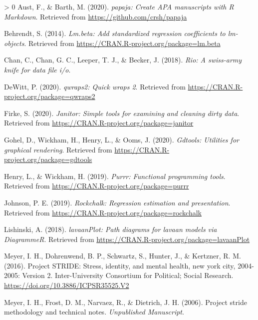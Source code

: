 \documentclass[
  english,
  man,floatsintext]{apa6}
\newlength{\cslhangindent}
\newenvironment{CSLReferences}[3] %
 {%
  \setlength{\parindent}{0pt}
  \ifodd #1 \everypar{\setlength{\hangindent}{\cslhangindent}}\ignorespaces\fi
  \ifnum #2 > 0
  \setlength{\parskip}{#2\baselineskip}
  \fi
 }%
 {}
\begin{document}
\hypertarget{refs}{}
\begin{CSLReferences}{1}{0}
\leavevmode\hypertarget{ref-R-papaja}{}%
Aust, F., \& Barth, M. (2020). \emph{{papaja}: {Create} {APA} manuscripts with {R Markdown}}. Retrieved from \url{https://github.com/crsh/papaja}

\leavevmode\hypertarget{ref-R-lm.beta}{}%
Behrendt, S. (2014). \emph{Lm.beta: Add standardized regression coefficients to lm-objects}. Retrieved from \url{https://CRAN.R-project.org/package=lm.beta}

\leavevmode\hypertarget{ref-R-rio}{}%
Chan, C., Chan, G. C., Leeper, T. J., \& Becker, J. (2018). \emph{Rio: A swiss-army knife for data file i/o}.

\leavevmode\hypertarget{ref-R-qwraps2}{}%
DeWitt, P. (2020). \emph{qwraps2: Quick wraps 2}. Retrieved from \url{https://CRAN.R-project.org/package=qwraps2}

\leavevmode\hypertarget{ref-R-janitor}{}%
Firke, S. (2020). \emph{Janitor: Simple tools for examining and cleaning dirty data}. Retrieved from \url{https://CRAN.R-project.org/package=janitor}

\leavevmode\hypertarget{ref-R-gdtools}{}%
Gohel, D., Wickham, H., Henry, L., \& Ooms, J. (2020). \emph{Gdtools: Utilities for graphical rendering}. Retrieved from \url{https://CRAN.R-project.org/package=gdtools}

\leavevmode\hypertarget{ref-R-purrr}{}%
Henry, L., \& Wickham, H. (2019). \emph{Purrr: Functional programming tools}. Retrieved from \url{https://CRAN.R-project.org/package=purrr}

\leavevmode\hypertarget{ref-R-rockchalk}{}%
Johnson, P. E. (2019). \emph{Rockchalk: Regression estimation and presentation}. Retrieved from \url{https://CRAN.R-project.org/package=rockchalk}

\leavevmode\hypertarget{ref-R-lavaanPlot}{}%
Lishinski, A. (2018). \emph{lavaanPlot: Path diagrams for lavaan models via DiagrammeR}. Retrieved from \url{https://CRAN.R-project.org/package=lavaanPlot}

\leavevmode\hypertarget{ref-projectstride}{}%
Meyer, I. H., Dohrenwend, B. P., Schwartz, S., Hunter, J., \& Kertzner, R. M. (2016). Project STRIDE: Stress, identity, and mental health, new york city, 2004-2005: Version 2. Inter-University Consortium for Political; Social Research. \url{https://doi.org/10.3886/ICPSR35525.V2}

\leavevmode\hypertarget{ref-projectstridemethod}{}%
Meyer, I. H., Frost, D. M., Narvaez, R., \& Dietrich, J. H. (2006). Project stride methodology and technical notes. \emph{Unpublished Manuscript}.


\end{CSLReferences}
\end{document}
